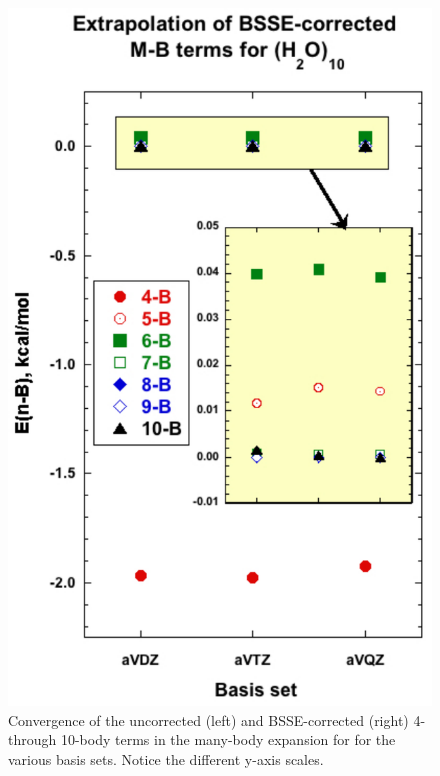 \begin{figure}[t]
\begin{center}
\begin{minipage}{0.45\textwidth}
\includegraphics[width=.9\textwidth]{Figures/Chapter_2/MB_extrap_w10_BSSE_all.pdf}
\end{minipage}
\end{center}
\begin{spacing}{1.0}
\caption[Convergence of the uncorrected (left) and BSSE-corrected (right) 4- through 10-body terms in the many-body expansion for  for the various basis sets. Notice the different y-axis scales.]{Convergence of the uncorrected (left) and BSSE-corrected (right) 4- through 10-body terms in the many-body expansion for  for the various basis sets. Notice the different y-axis scales.}\label{fig:MBE_I_F3}
\end{spacing}
\end{figure}